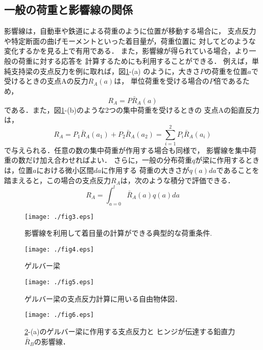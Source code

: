 \documentclass[10pt,a4j]{jarticle}
\begin{document}
\subsection{一般の荷重と影響線の関係}
影響線は，自動車や鉄道による荷重のように位置が移動する場合に，
支点反力や特定断面の曲げモーメントといった着目量が，荷重位置に
対してどのような変化するかを見る上で有用である．
また，影響線が得られている場合，より一般の荷重に対する応答を
計算するためにも利用することができる．
例えば，単純支持梁の支点反力を例に取れば，図\ref{fig:fig13_3}-(a)
のように，大きさ$P$の荷重を位置$a$で受けるときの支点Aの反力$R_A(a)$は，
単位荷重を受ける場合の$P$倍であるため，
\begin{equation}
	R_A =  P\bar{R}_A(a) 
\end{equation}
である．また，図\ref{fig:fig13_3}-(b)のような2つの集中荷重を受けるときの
支点Aの鉛直反力は，
\begin{equation}
	R_A =  
	P_1 \bar{R}_A(a_1)
	+
	P_2 \bar{R}_A(a_2)
	=
	\sum_{i=1}^2
	P_i \bar{R}_A(a_i)
\end{equation}
で与えられる．任意の数の集中荷重が作用する場合も同様で，
影響線を集中荷重の数だけ加え合わせればよい．
さらに，一般の分布荷重$q$が梁に作用するときは，位置$a$における微小区間$da$に作用する
荷重の大きさが$q(a)da$であることを踏まえると，この場合の支点反力$R_A$は，次のような積分で評価できる．
\begin{equation}
	R_A=\int_{a=0}^l \bar{R}_A(a)q(a)da 
\end{equation}

\begin{figure}[h]
	\begin{center}
	\texttt{[image: ./fig3.eps]} 
	\end{center}
	\caption{
		影響線を利用して着目量の計算ができる典型的な荷重条件.
	} 
	\label{fig:fig13_3}
\end{figure}
\begin{figure}[h]
	\begin{center}
	\texttt{[image: ./fig4.eps]} 
	\end{center}
	\caption{
		ゲルバー梁
	} 
	\label{fig:fig13_4}
\end{figure}
\begin{figure}[h]
	\begin{center}
	\texttt{[image: ./fig5.eps]} 
	\end{center}
	\caption{
		ゲルバー梁の支点反力計算に用いる自由物体図．
	} 
	\label{fig:fig13_5}
\end{figure}
\begin{figure}[h]
	\begin{center}
	\texttt{[image: ./fig6.eps]} 
	\end{center}
	\caption{
		\ref{fig:fig13_4}-(a)のゲルバー梁に作用する支点反力と
		ヒンジが伝達する鉛直力$\bar R_B$の影響線．
	} 
	\label{fig:fig13_6}
\end{figure}
\end{document}
